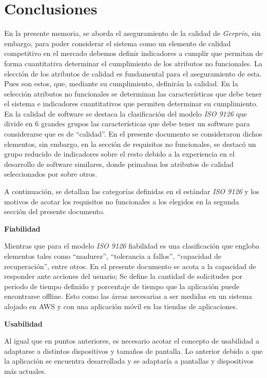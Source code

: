 
\chapter{Conclusiones }

En la presente memoria, se aborda el aseguramiento de la calidad de \textit{Gerprin}, sin embargo, para poder considerar el sistema como un elemento de calidad competitivo en el mercado debemos definir indicadores a cumplir que permitan de forma cuantitativa determinar el cumplimiento de los atributos no funcionales. 
La elección de los atributos de calidad es fundamental para el aseguramiento de esta. Pues son estos, que, mediante su cumplimiento, definirán la calidad. En la selección atributos no funcionales se determinan las características que debe tener el sistema e indicadores cuantitativos que permiten determinar su cumplimiento. En la calidad de software se destaca la clasificación del modelo \textit{ISO 9126} que divide en 6 grandes grupos las características que debe tener un software para considerarse que es de “calidad”. En el presente documento se consideraron dichos elementos, sin embargo, en la sección de requisitos no funcionales, se destacó un grupo reducido de indicadores sobre el resto debido a la experiencia en el desarrollo de software similares, donde primaban los atributos de calidad seleccionados por sobre otros. 

A continuación, se detallan las categorías definidas en el estándar \textit{ISO 9126} y los motivos de acotar los requisitos no funcionales a los elegidos en la segunda sección del presente documento. 

\textbf{Fiabilidad}

Mientras que para el modelo \textit{ISO 9126} fiabilidad es una clasificación que engloba elementos tales como “madurez”, “tolerancia a fallos”, “capacidad de recuperación”, entre otros. En el presente documento se acota a la capacidad de responder ante acciones del usuario; Se define la cantidad de solicitudes por periodo de tiempo definido y porcentaje de tiempo que la aplicación puede encontrarse offline. Esto como las áreas necesarias a ser medidas en un sistema alojado en AWS y con una aplicación móvil en las tiendas de aplicaciones.

\textbf{Usabilidad}

 Al igual que en puntos anteriores, es necesario acotar el concepto de usabilidad a adaptarse a distintos dispositivos y tamaños de pantalla. Lo anterior debido a que la aplicación se encuentra desarrollada y se adaptaría a pantallas y dispositivos más actuales.

